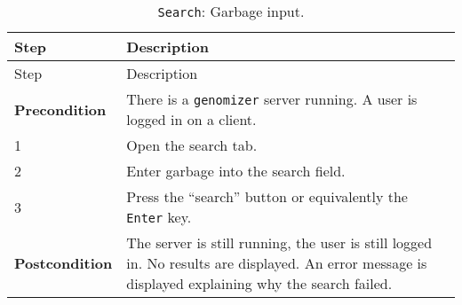 \begin{longtable}[c]{@{}ll@{}}
\caption{\texttt{Search}: Garbage input.}\tabularnewline
\toprule
\begin{minipage}[b]{0.31\columnwidth}\raggedright\strut
Step
\strut\end{minipage} &
\begin{minipage}[b]{0.63\columnwidth}\raggedright\strut
Description
\strut\end{minipage}\tabularnewline
\midrule
\endfirsthead
\toprule
\begin{minipage}[b]{0.31\columnwidth}\raggedright\strut
Step
\strut\end{minipage} &
\begin{minipage}[b]{0.63\columnwidth}\raggedright\strut
Description
\strut\end{minipage}\tabularnewline
\midrule
\endhead
\begin{minipage}[t]{0.31\columnwidth}\raggedright\strut
\textbf{Precondition}
\strut\end{minipage} &
\begin{minipage}[t]{0.63\columnwidth}\raggedright\strut
There is a \texttt{genomizer} server running. A user is logged in on a
client.
\strut\end{minipage}\tabularnewline
\begin{minipage}[t]{0.31\columnwidth}\raggedright\strut
1
\strut\end{minipage} &
\begin{minipage}[t]{0.63\columnwidth}\raggedright\strut
Open the search tab.
\strut\end{minipage}\tabularnewline
\begin{minipage}[t]{0.31\columnwidth}\raggedright\strut
2
\strut\end{minipage} &
\begin{minipage}[t]{0.63\columnwidth}\raggedright\strut
Enter garbage into the search field.
\strut\end{minipage}\tabularnewline
\begin{minipage}[t]{0.31\columnwidth}\raggedright\strut
3
\strut\end{minipage} &
\begin{minipage}[t]{0.63\columnwidth}\raggedright\strut
Press the ``search'' button or equivalently the \texttt{Enter} key.
\strut\end{minipage}\tabularnewline
\begin{minipage}[t]{0.31\columnwidth}\raggedright\strut
\textbf{Postcondition}
\strut\end{minipage} &
\begin{minipage}[t]{0.63\columnwidth}\raggedright\strut
The server is still running, the user is still logged in. No results are
displayed. An error message is displayed explaining why the search
failed.
\strut\end{minipage}\tabularnewline
\bottomrule
\end{longtable}

